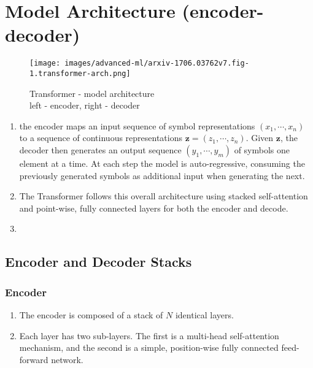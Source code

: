 \section{Model Architecture (encoder-decoder)}

\begin{figure}[H]
    \centering
    \texttt{[image: images/advanced-ml/arxiv-1706.03762v7.fig-1.transformer-arch.png]}
    \caption*{
        Transformer - model architecture \\
        left - encoder, right - decoder
        \cite{arxiv/1706.03762/Attention-Is-All-You-Need}
    }
\end{figure}


\begin{enumerate}
    \item the encoder maps an input sequence of symbol representations $(x_1, \cdots, x_n)$ to a sequence of continuous representations $\bm{z} = (z_1, \cdots, z_n)$. 
    Given $\bm{z}$, the decoder then generates an output sequence $(y_1, \cdots, y_m)$ of symbols one element at a time. 
    At each step the model is auto-regressive, consuming the previously generated symbols as additional input when generating the next.
    \hfill \cite{arxiv/1706.03762/Attention-Is-All-You-Need}

    \item The Transformer follows this overall architecture using stacked self-attention and point-wise, fully connected layers for both the encoder and decode.
    \hfill \cite{arxiv/1706.03762/Attention-Is-All-You-Need}

    \item 
\end{enumerate}


\subsection{Encoder and Decoder Stacks}

\subsubsection*{Encoder}

\begin{enumerate}
    \item The encoder is composed of a stack of $N$ identical layers.

    \item Each layer has two sub-layers. 
    The first is a multi-head self-attention mechanism, and 
    the second is a simple, position-wise fully connected feed-forward network.
\end{enumerate}











